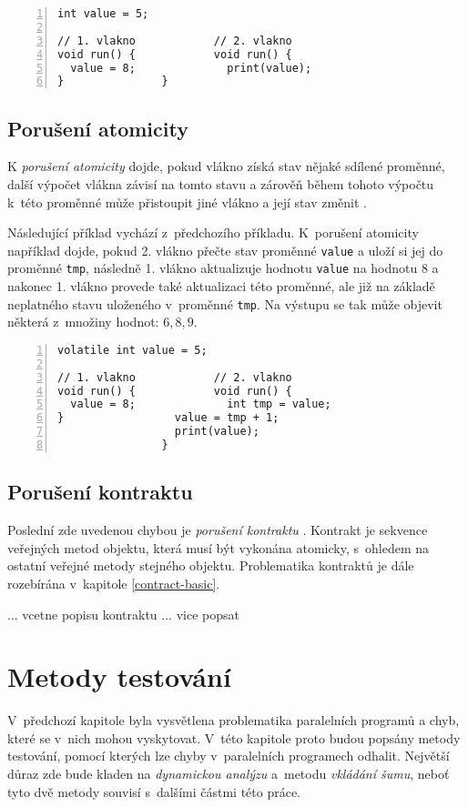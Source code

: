 \begin{lstlisting}[caption=Pseudokód příkladu časově závislé chyby nad daty., label={c:race}, frame=none, numbers=left, xleftmargin=1cm]
int value = 5;

// 1. vlakno			// 2. vlakno
void run() {			void run() {
  value = 8;			  print(value);
}				}
\end{lstlisting}

\subsection{Porušení atomicity}%
K \textit{porušení atomicity} dojde, pokud vlákno získá stav nějaké sdílené proměnné, další výpočet vlákna závisí na tomto stavu a zárověň během tohoto výpočtu k~této proměnné může přistoupit jiné vlákno a její stav změnit \cite{cite:OS2}.

Následující příklad vychází z~předchozího příkladu. K~porušení atomicity například dojde, pokud 2. vlákno přečte stav proměnné \texttt{value} a uloží si jej do proměnné \texttt{tmp}, následně 1. vlákno aktualizuje hodnotu \texttt{value} na hodnotu 8 a nakonec 1. vlákno provede také aktualizaci této proměnné, ale již na základě neplatného stavu uloženého v~proměnné \texttt{tmp}. Na výstupu se tak může objevit některá z~množiny hodnot: ${6, 8, 9}$.
\begin{lstlisting}[caption=Pseudokód porušení atomicity., frame=none, numbers=left, xleftmargin=1cm]
volatile int value = 5;

// 1. vlakno			// 2. vlakno
void run() {			void run() {
  value = 8;			  int tmp = value;
}				  value = tmp + 1;
				  print(value);
				}			
\end{lstlisting}

\subsection{Porušení kontraktu}

Poslední zde uvedenou chybou je \textit{porušení kontraktu} \cite{cite:contract0}. Kontrakt je sekvence veřejných metod objektu, která musí být vykonána atomicky, s~ohledem na ostatní veřejné metody stejného objektu. Problematika kontraktů je dále rozebírána v~kapitole \ref{contract-basic}.

... vcetne popisu kontraktu ... vice popsat


\section{Metody testování}
V~předchozí kapitole byla vysvětlena problematika paralelních programů a chyb, které se v~nich mohou vyskytovat. V~této kapitole proto budou popsány metody testování, pomocí kterých lze chyby v~paralelních programech odhalit. Největší důraz zde bude kladen na \textit{dynamickou analýzu} a~metodu \textit{vkládání šumu}, neboť tyto dvě metody souvisí s~dalšími částmi této práce.

